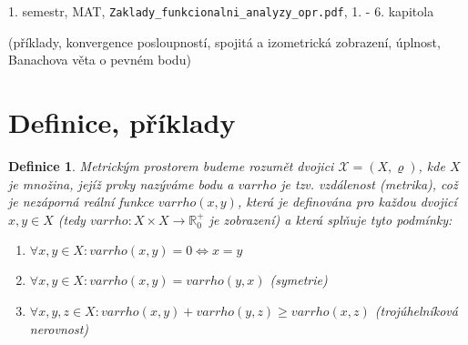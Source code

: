 \documentclass[a4paper, 11pt]{report}
\newtheorem{mydef}{Definice}[chapter]
\begin{document}
1. semestr, MAT, \texttt{Zaklady\_funkcionalni\_analyzy\_opr.pdf}, 1. -  6. kapitola

(příklady, konvergence posloupností, spojitá a izometrická zobrazení, úplnost, Banachova věta o pevném bodu)

\section{Definice, příklady}
\begin{mydef}
Metrickým prostorem budeme rozumět dvojici $\mathcal{X} = (X, \varrho)$, kde $X$ je množina, jejíž prvky nazýváme bodu a $varrho$ je tzv. vzdálenost (metrika), což je nezáporná reální funkce $varrho(x, y)$, která je definována pro každou dvojicí $x, y \in X$ (tedy $varrho: X \times X \to \mathbb{R}_0^+$ je zobrazení) a která splňuje tyto podmínky:
\begin{enumerate}[1)]
	\item $\forall x, y \in X: varrho(x, y) = 0 \Leftrightarrow x = y$
	\item $\forall x, y \in X: varrho(x, y) = varrho(y, x)$ (symetrie)
	\item $\forall x, y, z \in X: varrho(x, y) + varrho(y, z) \geq varrho(x, z)$ (trojúhelníková nerovnost)
\end{enumerate}
\end{mydef}
\end{document}
